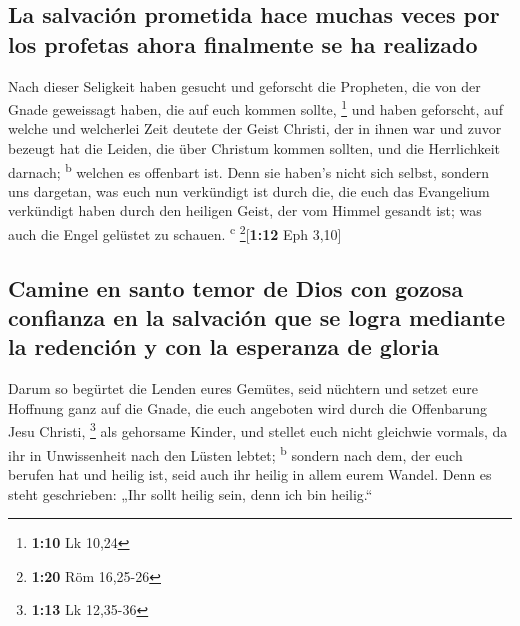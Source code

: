 \hypertarget{la-salvaciuxf3n-prometida-hace-muchas-veces-por-los-profetas-ahora-finalmente-se-ha-realizado}{%
\subsection{La salvación prometida hace muchas veces por los profetas
ahora finalmente se ha
realizado}\label{la-salvaciuxf3n-prometida-hace-muchas-veces-por-los-profetas-ahora-finalmente-se-ha-realizado}}

 Nach dieser Seligkeit haben gesucht und geforscht die
Propheten, die von der Gnade geweissagt haben, die auf euch kommen
sollte, \footnote{\textbf{1:10} Lk 10,24}  und haben
geforscht, auf welche und welcherlei Zeit deutete der Geist Christi, der
in ihnen war und zuvor bezeugt hat die Leiden, die über Christum kommen
sollten, und die Herrlichkeit darnach; \textsuperscript{b}
 welchen es offenbart ist. Denn sie haben's nicht sich
selbst, sondern uns dargetan, was euch nun verkündigt ist durch die, die
euch das Evangelium verkündigt haben durch den heiligen Geist, der vom
Himmel gesandt ist; was auch die Engel gelüstet zu schauen.
\textsuperscript{c} \footnote{\textbf{1:20} Röm 16,25-26}{[}\textbf{1:12}
Eph 3,10{]}

\hypertarget{camine-en-santo-temor-de-dios-con-gozosa-confianza-en-la-salvaciuxf3n-que-se-logra-mediante-la-redenciuxf3n-y-con-la-esperanza-de-gloria}{%
\subsection{Camine en santo temor de Dios con gozosa confianza en la
salvación que se logra mediante la redención y con la esperanza de
gloria}\label{camine-en-santo-temor-de-dios-con-gozosa-confianza-en-la-salvaciuxf3n-que-se-logra-mediante-la-redenciuxf3n-y-con-la-esperanza-de-gloria}}

 Darum so begürtet die Lenden eures Gemütes, seid
nüchtern und setzet eure Hoffnung ganz auf die Gnade, die euch angeboten
wird durch die Offenbarung Jesu Christi, \footnote{\textbf{1:13} Lk
  12,35-36}  als gehorsame Kinder, und stellet euch nicht
gleichwie vormals, da ihr in Unwissenheit nach den Lüsten lebtet;
\textsuperscript{b}  sondern nach dem, der euch berufen
hat und heilig ist, seid auch ihr heilig in allem eurem Wandel.
 Denn es steht geschrieben: „Ihr sollt heilig sein, denn
ich bin heilig.``

